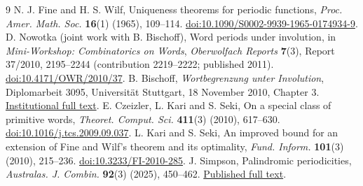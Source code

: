 \documentclass[10pt]{article}
\begin{document}
\begin{thebibliography}{9}
N. J. Fine and H. S. Wilf,
Uniqueness theorems for periodic functions,
\emph{Proc. Amer. Math. Soc.} \textbf{16}(1) (1965), 109--114.
\href{https://doi.org/10.1090/S0002-9939-1965-0174934-9}{doi:10.1090/S0002-9939-1965-0174934-9}.
D. Nowotka (joint work with B. Bischoff), Word periods under involution,
in \emph{Mini-Workshop: Combinatorics on Words},
\emph{Oberwolfach Reports} \textbf{7}(3), Report 37/2010,
2195--2244 (contribution 2219--2222; published 2011).
\href{https://doi.org/10.4171/OWR/2010/37}{doi:10.4171/OWR/2010/37}.
B. Bischoff, \emph{Wortbegrenzung unter Involution},
Diplomarbeit 3095, Universit\"at Stuttgart, 18 November 2010, Chapter 3.
\href{https://www2.informatik.uni-stuttgart.de/bibliothek/ftp/medoc_restrict.ustuttgart_fi/DIP-3095/DIP-3095.pdf}{Institutional full text}.
E. Czeizler, L. Kari and S. Seki,
On a special class of primitive words,
\emph{Theoret. Comput. Sci.} \textbf{411}(3) (2010), 617--630.
\href{https://doi.org/10.1016/j.tcs.2009.09.037}{doi:10.1016/j.tcs.2009.09.037}.
L. Kari and S. Seki,
An improved bound for an extension of Fine and Wilf's theorem
and its optimality,
\emph{Fund. Inform.} \textbf{101}(3) (2010), 215--236.
\href{https://doi.org/10.3233/FI-2010-285}{doi:10.3233/FI-2010-285}.
J. Simpson, Palindromic periodicities,
\emph{Australas. J. Combin.} \textbf{92}(3) (2025), 450--462.
\href{https://ajc.maths.uq.edu.au/pdf/92/ajc_v92_p450.pdf}{Published full text}.
\end{thebibliography}
\end{document}
